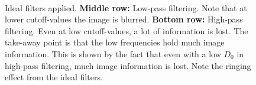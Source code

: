 \documentclass[a4paper, 10pt, final]{article}
\begin{document}
\begin{figure}[!h]
    \\
    \caption[]{Ideal filters applied. \textbf{Middle row:} Low-pass
    filtering.  Note that at lower cutoff-values the image is blurred.
    \textbf{Bottom row:} High-pass filtering. Even at low cutoff-values,
    a lot of information is lost. The take-away
    point is that the low frequencies hold much image information. This
    is shown by the fact that even with a low $D_0$ in high-pass
    filtering, much image information is lost. Note the ringing effect
    from the ideal filters.
    }
    \label{ideal_unix}
\end{figure}
\end{document}
